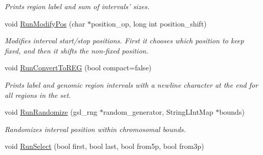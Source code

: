 \begin{CompactItemize}
\begin{CompactList}\small\item\em Prints region label and sum of intervals' sizes. \item\end{CompactList}\item 
void \hyperlink{classGenomicRegionSet_11f1e58c92e9b0b2e3feb5821cff1a55}{RunModifyPos} (char $\ast$position\_\-op, long int position\_\-shift)
\begin{CompactList}\small\item\em Modifies interval start/stop positions. First it chooses which position to keep fixed, and then it shifts the non-fixed position. \item\end{CompactList}\item 
\hypertarget{classGenomicRegionSet_8f71dd5fa48a0878751cd78a3b485daf}{
void \hyperlink{classGenomicRegionSet_8f71dd5fa48a0878751cd78a3b485daf}{RunConvertToREG} (bool compact=false)}
\label{classGenomicRegionSet_8f71dd5fa48a0878751cd78a3b485daf}

\begin{CompactList}\small\item\em Prints label and genomic region intervals with a newline character at the end for all regions in the set. \item\end{CompactList}\item 
\hypertarget{classGenomicRegionSet_1b2b9edad211ca961f319921d38bfbf6}{
void \hyperlink{classGenomicRegionSet_1b2b9edad211ca961f319921d38bfbf6}{RunRandomize} (gsl\_\-rng $\ast$random\_\-generator, StringLIntMap $\ast$bounds)}
\label{classGenomicRegionSet_1b2b9edad211ca961f319921d38bfbf6}

\begin{CompactList}\small\item\em Randomizes interval position within chromosomal bounds. \item\end{CompactList}\item 
\hypertarget{classGenomicRegionSet_7b522944fe4f7f489c99fb76ce7f576c}{
void \hyperlink{classGenomicRegionSet_7b522944fe4f7f489c99fb76ce7f576c}{RunSelect} (bool first, bool last, bool from5p, bool from3p)}
\label{classGenomicRegionSet_7b522944fe4f7f489c99fb76ce7f576c}


\end{CompactItemize}

